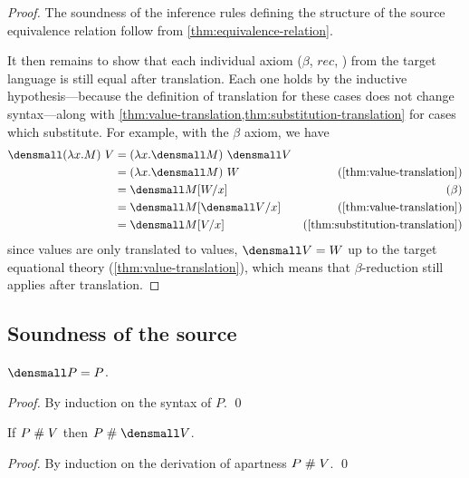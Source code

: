 \thmconservativeextension*
\begin{proof}
  The soundness of the inference rules defining the structure of the source equivalence relation follow from \cref{thm:equivalence-relation}.
  
  It then remains to show that each individual axiom ($\beta$, $rec$, \etc) from the target language is still equal after translation.  Each one holds by the inductive hypothesis---because the definition of translation for these cases does not change syntax---along with \cref{thm:value-translation,thm:substitution-translation} for cases which substitute.
  For example, with the $\beta$ axiom, we have
  \begin{align*}
    \den{(\lambda x. M) ~ V}
    &=
    (\lambda x. \den{M}) ~ \den{V}
    \\
    &=
    (\lambda x. \den{M}) ~ W
    &(\cref{thm:value-translation})
    \\
    &=
    \den{M}\subst{x}{W}
    &(\beta)
    \\
    &=
    \den{M}\subst{x}{\den{V}}
    &(\cref{thm:value-translation})
    \\
    &=
    \den{M\subst{x}{V}}
    &(\cref{thm:substitution-translation})
  \end{align*}
  since values are only translated to values, $\den{V} = W$ up to the target equational theory (\cref{thm:value-translation}), which means that $\beta$-reduction still applies after translation.
\end{proof}

\subsection{Soundness of the source}

\begin{lemma}
  \label{thm:pattern-translation}

  $\den{P} = P$.
\end{lemma}
\begin{proof}
  By induction on the syntax of $P$.
  \qed
\end{proof}

\begin{lemma}
  \label{thm:apartness-translation}

  If $P \mathrel{\#} V$ then $P \apart \den{V}$.
\end{lemma}
\begin{proof}
  By induction on the derivation of apartness $P \mathrel{\#} V$.
  \qed
\end{proof}

